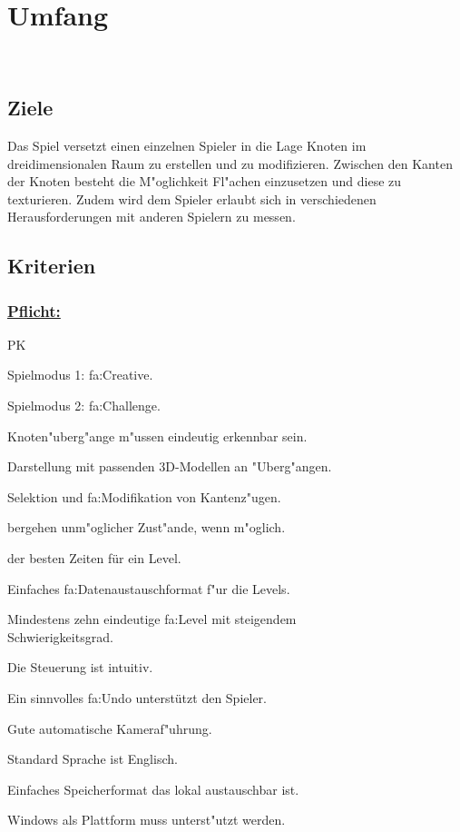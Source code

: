 %
%


\chapter{Umfang}
\label{UF}~\\


%
%
\section{Ziele}
\label{UF:Ziele}

Das Spiel versetzt einen einzelnen Spieler in die Lage Knoten im dreidimensionalen Raum zu erstellen und zu modifizieren. Zwischen den Kanten der Knoten besteht die M{"o}glichkeit Fl{"a}chen einzusetzen und diese zu texturieren. Zudem wird dem Spieler erlaubt sich in verschiedenen Herausforderungen mit anderen Spielern zu messen.\\


\section{Kriterien}
% 
%
\subsection*{\underline{Pflicht:}}

\vspace{1em}

\begin{ids}{\gls{PK}}

	\id[10] Spielmodus 1: \gls{fa:Creative}.
		
	\id[20] Spielmodus 2: \gls{fa:Challenge}.
		
	\id[30] Knoten{"u}berg{"a}nge m{"u}ssen eindeutig erkennbar sein.
		
	\id[40] Darstellung mit passenden 3D-Modellen an {"U}berg{"a}ngen.
		
	\id[50] Selektion und \gls{fa:Modifikation} von Kantenz{"u}gen.
		
	bergehen unm{"o}glicher Zust{"a}nde, wenn m{"o}glich.
		
	 der besten Zeiten für ein Level.
		
	\id[80] Einfaches \gls{fa:Datenaustauschformat} f{"u}r die Levels.
		
	\id[80] Mindestens zehn eindeutige \gls{fa:Level} mit steigendem \\Schwierigkeitsgrad.
		
	\id[90] Die Steuerung ist intuitiv.
		
	\id[100] Ein sinnvolles \gls{fa:Undo} unterstützt den Spieler.
		
	\id[110] Gute automatische Kameraf{"u}hrung.
		
	\id[120] Standard Sprache ist Englisch.
		
	\id[130] Einfaches Speicherformat das lokal austauschbar ist.
		
	\id[140] Windows als Plattform muss unterst{"u}tzt werden.

\end{ids}


